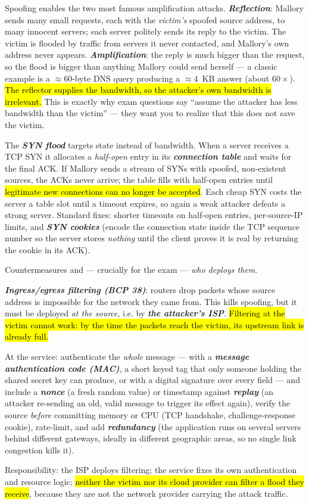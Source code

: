 \documentclass[12pt, a4paper]{article}
\newcommand{\term}[1]{\textbf{\textit{#1}}}        %
\newcommand{\imp}[1]{\hl{#1}}                       %
\begin{document}
Spoofing enables the two most famous amplification attacks. \term{Reflection}: Mallory sends many small requests, each with the \emph{victim's} spoofed source address, to many innocent servers; each server politely sends its reply to the victim. The victim is flooded by traffic from servers it never contacted, and Mallory's own address never appears. \term{Amplification}: the reply is much bigger than the request, so the flood is bigger than anything Mallory could send herself --- a classic example is a $\approx 60$-byte DNS query producing a $\approx 4$~KB answer (about $60\times$). \imp{The reflector supplies the bandwidth, so the attacker's own bandwidth is irrelevant.} This is exactly why exam questions say ``assume the attacker has less bandwidth than the victim'' --- they want you to realize that this does not save the victim.

The \term{SYN flood} targets state instead of bandwidth. When a server receives a TCP SYN it allocates a \emph{half-open} entry in its \term{connection table} and waits for the final ACK. If Mallory sends a stream of SYNs with spoofed, non-existent sources, the ACKs never arrive; the table fills with half-open entries until \imp{legitimate new connections can no longer be accepted}. Each cheap SYN costs the server a table slot until a timeout expires, so again a weak attacker defeats a strong server. Standard fixes: shorter timeouts on half-open entries, per-source-IP limits, and \term{SYN cookies} (encode the connection state inside the TCP sequence number so the server stores \emph{nothing} until the client proves it is real by returning the cookie in its ACK).

Countermeasures and --- crucially for the exam --- \emph{who deploys them}. \begin{tightitem}\item \term{Ingress/egress filtering (BCP 38)}: routers drop packets whose source address is impossible for the network they came from. This kills spoofing, but it must be deployed \emph{at the source}, i.e. by \term{the attacker's ISP}. \imp{Filtering at the victim cannot work: by the time the packets reach the victim, its upstream link is already full.}\item At the service: authenticate the \emph{whole} message --- with a \term{message authentication code (MAC)}, a short keyed tag that only someone holding the shared secret key can produce, or with a digital signature over every field --- and include a \term{nonce} (a fresh random value) or timestamp against \term{replay} (an attacker re-sending an old, valid message to trigger its effect again), verify the source \emph{before} committing memory or CPU (TCP handshake, challenge-response cookie), rate-limit, and add \term{redundancy} (the application runs on several servers behind different gateways, ideally in different geographic areas, so no single link congestion kills it).\item Responsibility: the ISP deploys filtering; the service fixes its own authentication and resource logic; \imp{neither the victim nor its cloud provider can filter a flood they receive}, because they are not the network provider carrying the attack traffic.\end{tightitem}
\end{document}
